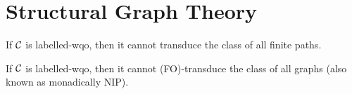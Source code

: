 \section{Structural Graph Theory}

\begin{remark}
    \label{transductions-paths:rem}
    If $\mathcal{C}$ is labelled-wqo, then it cannot transduce
    the class of all finite paths.
\end{remark}

\begin{remark}
    If $\mathcal{C}$ is labelled-wqo, then it cannot (FO)-transduce 
    the class of all graphs (also known as monadically NIP).
\end{remark}

